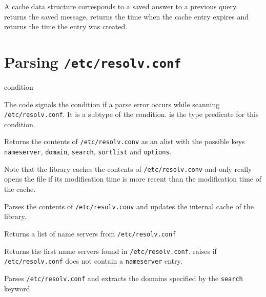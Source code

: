 \begin{desc}
  A cache data structure corresponds to a saved answer to a previous
  query.  returns the saved message, 
  returns the time when the cache entry expires and 
  returns the time the entry was created.
\end{desc}

\section{Parsing \texttt{/etc/resolv.conf}}
\label{sec:dns-rc}

 {condition}
\begin{desc}
  The code signals the condition  if a
  parse error occurs while scanning \texttt{/etc/resolv.conf}. It is a
  subtype of the  condition.
   is the type predicate for this
  condition.
\end{desc}

\begin{desc}
  Returns the contents of \texttt{/etc/resolv.conv} as an alist with
  the possible keys \texttt{nameserver}, \texttt{domain},
  \texttt{search}, \texttt{sortlist} and \texttt{options}.
  
  Note that the library caches the contents of
  \texttt{/etc/resolv.conv} and  only really opens the
  file if its modification time is more recent than the modification
  time of the cache.
\end{desc}
\begin{desc}
  Parses the contents of \texttt{/etc/resolv.conv} and updates the
  internal cache of the library.
\end{desc}
\begin{desc}
  Returns a list of name servers from \texttt{/etc/resolv.conf}
\end{desc}
\begin{desc}
  Returns the first name servers found in \texttt{/etc/resolv.conf}.
   raises  if
  \texttt{/etc/resolv.conf} does not contain a \texttt{nameserver}
  entry.
\end{desc}
\begin{desc}
  Parses \texttt{/etc/resolv.conf} and extracts the domains specified
  by the \texttt{search} keyword.
\end{desc}


